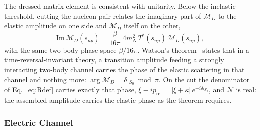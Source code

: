\documentclass[
  aps,prd,twocolumn,nofootinbib,superscriptaddress,
  longbibliography,floatfix,preprintnumbers
]{revtex4-2}
\newcommand{\prel}{p_{\mathrm{rel}}}
\begin{document}
The dressed matrix element is consistent with unitarity. Below the
inelastic threshold, cutting the nucleon pair relates the imaginary part
of $\mathcal{M}_{D}$ to the elastic amplitude on one side and
$\mathcal{M}_{D}$ itself on the other,
\begin{equation}
  \mathrm{Im}\,\mathcal{M}_{D}(s_{np})
  = \frac{\beta}{16\pi}\;4m_{N}^{2}\,
    T^{*}(s_{np})\,\mathcal{M}_{D}(s_{np}),
  \label{eq:watsoncut}
\end{equation}
with the same two-body phase space $\beta/16\pi$. Watson's
theorem~\cite{Watson:1954uc,Watson:1952ji} states that in a
time-reversal-invariant theory, a transition
amplitude feeding a strongly interacting two-body channel carries the
phase of the elastic scattering in that channel and nothing more:
$\arg\mathcal{M}_{D} = \delta_{^{1}S_{0}} \bmod \pi$.  On the cut the denominator
of Eq.~\eqref{eq:Rdef} carries exactly that phase,
$\xi - i\prel = |\xi+\kappa|\,e^{-i\delta_{^{1}S_{0}}}$, and
$\mathcal{N}$ is real: the assembled amplitude carries the elastic
phase as the theorem requires.

\subsubsection{Electric Channel}
\label{app:E1dress}
\end{document}
